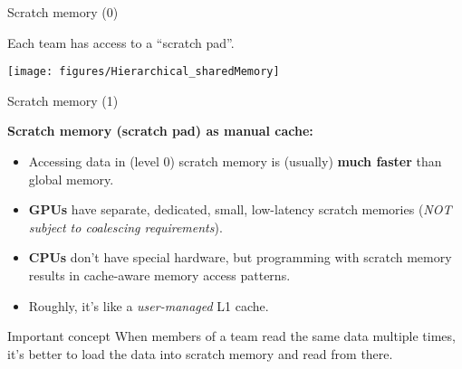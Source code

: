 
\begin{frame}[fragile]{Scratch memory (0)}

  Each team has access to a ``scratch pad''.

  \vspace{-10pt}

  \begin{center}
    \texttt{[image: figures/Hierarchical\_sharedMemory]}
  \end{center}

\end{frame}


\begin{frame}[fragile]{Scratch memory (1)}

  \textbf{Scratch memory (scratch pad) as manual cache:}

  \begin{itemize}
    \item{Accessing data in (level 0) scratch memory is (usually) \textbf{much faster} than global memory.}
    \item{\textbf{GPUs} have separate, dedicated, small, low-latency scratch memories (\emph{NOT subject to coalescing requirements}).}
    \item{\textbf{CPUs} don't have special hardware, but programming with scratch memory results in cache-aware memory access patterns.}
    \item{Roughly, it's like a \emph{user-managed} L1 cache.}
  \end{itemize}

  \pause

  \begin{block}{Important concept}
    When members of a team read the same data multiple times, it's better to load the data into scratch memory and read from there.
  \end{block}

\end{frame}


